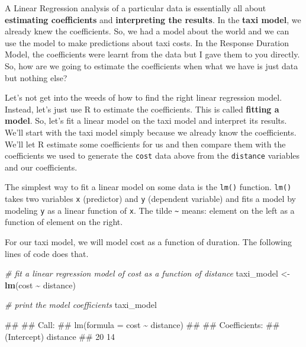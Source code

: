 \documentclass[
]{book}
\newenvironment{Shaded}{\begin{snugshade}}{\end{snugshade}}
\newcommand{\CommentTok}[1]{\textcolor[rgb]{0.56,0.35,0.01}{\textit{#1}}}
\newcommand{\FunctionTok}[1]{\textcolor[rgb]{0.13,0.29,0.53}{\textbf{#1}}}
\newcommand{\NormalTok}[1]{#1}
\newcommand{\OtherTok}[1]{\textcolor[rgb]{0.56,0.35,0.01}{#1}}
\newcommand{\SpecialCharTok}[1]{\textcolor[rgb]{0.81,0.36,0.00}{\textbf{#1}}}
\begin{document}
A Linear Regression analysis of a particular data is essentially all about \textbf{estimating coefficients} and \textbf{interpreting the results}. In the \textbf{taxi model}, we already knew the coefficients. So, we had a model about the world and we can use the model to make predictions about taxi costs. In the Response Duration Model, the coefficients were learnt from the data but I gave them to you directly. So, how are we going to estimate the coefficients when what we have is just data but nothing else?

Let's not get into the weeds of how to find the right linear regression model. Instead, let's just use R to estimate the coefficients. This is called \textbf{fitting a model}. So, let's fit a linear model on the taxi model and interpret its results. We'll start with the taxi model simply because we already know the coefficients. We'll let R estimate some coefficients for us and then compare them with the coefficients we used to generate the \texttt{cost} data above from the \texttt{distance} variables and our coefficients.

The simplest way to fit a linear model on some data is the \texttt{lm()} function. \texttt{lm()} takes two variables \texttt{x} (predictor) and \texttt{y} (dependent variable) and fits a model by modeling \texttt{y} as a linear function of \texttt{x}. The tilde \texttt{\textasciitilde{}} means: element on the left as a function of element on the right.

For our taxi model, we will model cost as a function of duration. The following lines of code does that.

\begin{Shaded}
\begin{Highlighting}[]
\CommentTok{\# fit a linear regression model of cost as a function of distance}
\NormalTok{taxi\_model }\OtherTok{\textless{}{-}} \FunctionTok{lm}\NormalTok{(cost }\SpecialCharTok{\textasciitilde{}}\NormalTok{ distance)}

\CommentTok{\# print the model coefficients}
\NormalTok{taxi\_model}
\end{Highlighting}
\end{Shaded}

\begin{Shaded}
\begin{Highlighting}[]
\NormalTok{\#\# }
\NormalTok{\#\# Call:}
\NormalTok{\#\# lm(formula = cost \textasciitilde{} distance)}
\NormalTok{\#\# }
\NormalTok{\#\# Coefficients:}
\NormalTok{\#\# (Intercept)     distance  }
\NormalTok{\#\#          20           14}
\end{Highlighting}
\end{Shaded}
\end{document}
